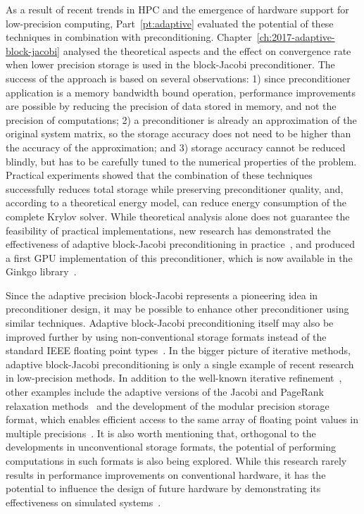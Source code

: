 As a result of recent trends in HPC and the emergence of hardware support for
low-precision computing, Part~\ref{pt:adaptive} evaluated the potential of these
techniques in combination with preconditioning.
Chapter~\ref{ch:2017-adaptive-block-jacobi} analysed the theoretical aspects and
the effect on convergence rate when lower precision storage is used in the
block-Jacobi preconditioner. The success of the approach is based on
several observations: 1) since preconditioner application is a memory bandwidth
bound operation, performance improvements are possible by reducing the precision
of data stored in memory, and not the precision of computations; 2) a
preconditioner is already an approximation of the original system matrix, so the
storage accuracy does not need to be higher than the accuracy of the
approximation; and 3) storage accuracy cannot be reduced blindly, but has to be
carefully tuned to the numerical properties of the problem. Practical
experiments showed that the combination of these techniques successfully reduces
total storage while preserving preconditioner quality, and, according to a
theoretical energy model, can reduce energy consumption of the complete Krylov
solver. While theoretical analysis alone does not guarantee the feasibility of
practical implementations, new research has demonstrated the effectiveness of
adaptive block-Jacobi preconditioning in practice~\cite{adaptive-jacobi-gpu},
and produced a first GPU implementation of this preconditioner, which is now
available in the Ginkgo library~\cite{ginkgo}.

Since the adaptive precision block-Jacobi represents a pioneering idea in
preconditioner design, it may be possible to enhance other preconditioner using
similar techniques. Adaptive block-Jacobi preconditioning itself may also be
improved further by using non-conventional storage formats instead of the
standard IEEE floating point types~\cite{adaptive-jacobi-gpu}. In the bigger
picture of iterative methods, adaptive block-Jacobi preconditioning is only a
single example of recent research in low-precision methods. In addition to the
well-known iterative refinement~\cite{higham-ir}, other examples include the
adaptive versions of the Jacobi and PageRank relaxation
methods~\cite{jacobi,jacobi-modular,pagerank} and the development of the modular
precision storage format, which enables efficient access to the same array of
floating point values in multiple
precisions~\cite{jacobi-modular,pagerank,anzt-ir}. It is also worth mentioning
that, orthogonal to the developments in unconventional storage formats, the
potential of performing computations in such formats is also being explored.
While this research rarely results in performance improvements on conventional
hardware, it has the potential to influence the design of future hardware by
demonstrating its effectiveness on simulated systems~\cite{floatx, flexfloat}.

